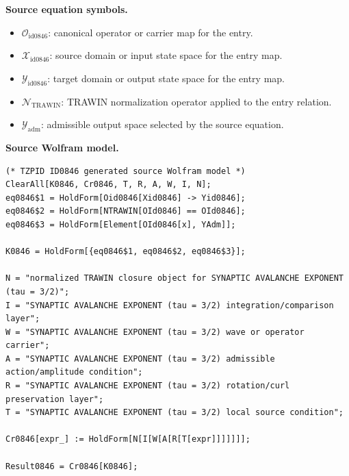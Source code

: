 \begin{minipage}[t]{0.49\linewidth}
\begingroup
\small
\raggedright
\textbf{Source equation symbols.}\par
\begin{itemize}[leftmargin=1.35em,itemsep=1pt,topsep=1pt,parsep=0pt]
    \item $\mathcal{O}_{\mathrm{id0846}}$: canonical operator or carrier map for the entry.
    \item $\mathcal{X}_{\mathrm{id0846}}$: source domain or input state space for the entry map.
    \item $\mathcal{Y}_{\mathrm{id0846}}$: target domain or output state space for the entry map.
    \item $\mathcal{N}_{\mathrm{TRAWIN}}$: TRAWIN normalization operator applied to the entry relation.
    \item $\mathcal{Y}_{\mathrm{adm}}$: admissible output space selected by the source equation.
\end{itemize}
\endgroup
\end{minipage}\hfill
\begin{minipage}[t]{0.47\linewidth}
\begingroup
\scriptsize
\raggedright
\textbf{Source Wolfram model.}\par
\begin{Verbatim}[fontsize=\tiny,breaklines=true,breakanywhere=true]
(* TZPID ID0846 generated source Wolfram model *)
ClearAll[K0846, Cr0846, T, R, A, W, I, N];
eq0846$1 = HoldForm[Oid0846[Xid0846] -> Yid0846];
eq0846$2 = HoldForm[NTRAWIN[OId0846] == OId0846];
eq0846$3 = HoldForm[Element[OId0846[x], YAdm]];

K0846 = HoldForm[{eq0846$1, eq0846$2, eq0846$3}];

N = "normalized TRAWIN closure object for SYNAPTIC AVALANCHE EXPONENT (tau = 3/2)";
I = "SYNAPTIC AVALANCHE EXPONENT (tau = 3/2) integration/comparison layer";
W = "SYNAPTIC AVALANCHE EXPONENT (tau = 3/2) wave or operator carrier";
A = "SYNAPTIC AVALANCHE EXPONENT (tau = 3/2) admissible action/amplitude condition";
R = "SYNAPTIC AVALANCHE EXPONENT (tau = 3/2) rotation/curl preservation layer";
T = "SYNAPTIC AVALANCHE EXPONENT (tau = 3/2) local source condition";

Cr0846[expr_] := HoldForm[N[I[W[A[R[T[expr]]]]]]];

Result0846 = Cr0846[K0846];
\end{Verbatim}
\endgroup
\end{minipage}

